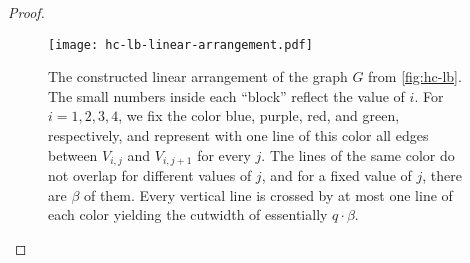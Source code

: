 \documentclass[a4paper,UKenglish,cleveref, autoref, thm-restate]{lipics-v2021}
\begin{document}
\begin{proof}
	\begin{figure}[t]
		\centering
		\texttt{[image: hc-lb-linear-arrangement.pdf]}
		\caption{The constructed linear arrangement of the graph $G$ from \cref{fig:hc-lb}. The small numbers inside each ``block'' reflect the value of $i$. 
		For $i = 1, 2, 3, 4$, we fix the color blue, purple, red, and green, respectively, and represent with one line of this color all edges between $V_{i,j}$ and $V_{i,j+1}$ for every $j$. 
		The lines of the same color do not overlap for different values of $j$, and for a fixed value of $j$, there are $\beta$ of them.
		Every vertical line is crossed by at most one line of each color yielding the cutwidth of essentially $q \cdot \beta$.}
		\label{fig:hc-lb-linear-arrangement}
	\end{figure}


\end{proof}
\end{document}
